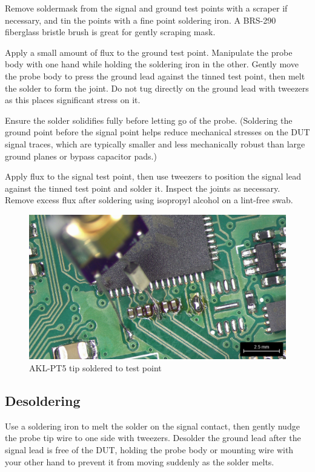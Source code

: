 \documentclass[11pt]{article}
\begin{document}
Remove soldermask from the signal and ground test points with a scraper if necessary, and tin the points with a fine
point soldering iron. A BRS-290 fiberglass bristle brush is great for gently scraping mask. 

Apply a small amount of flux to the ground test point. Manipulate the probe body with one hand while holding the
soldering iron in the other. Gently move the probe body to press the ground lead against the tinned test point, then
melt the solder to form the joint. Do not tug directly on the ground lead with tweezers as this places significant
stress on it.

Ensure the solder solidifies fully before letting go of the probe. (Soldering the ground point before the signal point
helps reduce mechanical stresses on the DUT signal traces, which are typically smaller and less mechanically robust
than large ground planes or bypass capacitor pads.)

Apply flux to the signal test point, then use tweezers to position the signal lead against the tinned test point and
solder it. Inspect the joints as necessary. Remove excess flux after soldering using isopropyl alcohol on a lint-free
swab.

\begin{figure}[h]
\centering
\includegraphics[width=12cm]{tip-soldered.jpg}
\caption{AKL-PT5 tip soldered to test point}
\label{tip-on-testpoint}
\end{figure}
\FloatBarrier

\subsection{Desoldering}

Use a soldering iron to melt the solder on the signal contact, then gently nudge the probe tip wire to one side with
tweezers. Desolder the ground lead after the signal lead is free of the DUT, holding the probe body or mounting wire
with your other hand to prevent it from moving suddenly as the solder melts.
\end{document}
